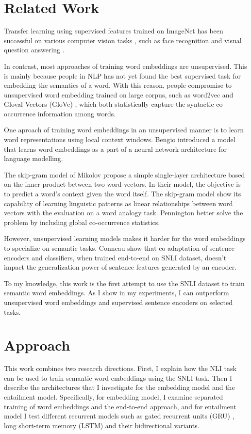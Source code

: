 \documentclass[10pt,twocolumn,letterpaper]{article}
\begin{document}
\section{Related Work}
Transfer learning using supervised features trained on ImageNet \cite{deng2009imagenet} has been successful on various computer vision tasks \cite{sharif2014cnn}, such as face recognition \cite{taigman2014deepface} and visual question answering \cite{antol2015vqa}.

In contrast, most approaches of training word embeddings are unsupervised. This is mainly because people in NLP has not yet found the best supervised task for embedding the semantics of a word. With this reason, people compromise to unsupervised word embedding trained on large corpus, such as word2vec \cite{mikolov2013distributed} and Gloval Vectors (GloVe) \cite{pennington2014glove}, which both statistically capture the syntactic co-occurrence information among words.

One aproach of training word embeddings in an unsupervised manner is to learn word representations using local context windows. Bengio \etal \cite{bengio2003neural} introduced a model that learns word embeddings as a part of a neural network architecture for language modelling.

The skip-gram model of Mikolov \etal \cite{mikolov2013distributed} propose a simple single-layer architecture based on the inner product between two word vectors. In their model, the objective is to predict a word's context given the word itself. The skip-gram model show its capability of learning linguistic patterns as linear relationships between word vectors with the evaluation on a word analogy task. Pennington \etal better solve the problem by including global co-occurrence statistics.

However, unsupervised learning models makes it harder for the word embeddings to specialize on semantic tasks. Conneau \etal \cite{conneau2017supervised} show that co-adaptation of sentence encoders and classifiers, when trained end-to-end on SNLI dataset, doesn't impact the generalization power of sentence features generated by an encoder.

To my knowledge, this work is the first attempt to use the SNLI dataset to train semantic word embeddings. As I show in my experiments, I can outperform unsupervised word embeddings and supervised sentence encoders on selected tasks.

\section{Approach}
This work combines two research directions. First, I explain how the NLI task can be used to train semantic word embeddings using the SNLI task. Then I describe the architectures that I investigate for the embedding model and the entailment model. Specifically, for embedding model, I examine separated training of word embeddings and the end-to-end approach, and for entailment model I test different recurrent models such as gated recurrent units (GRU) \cite{chung2014empirical}, long short-term memory (LSTM) \cite{hochreiter1997long} and their bidirectional variants.
\end{document}
